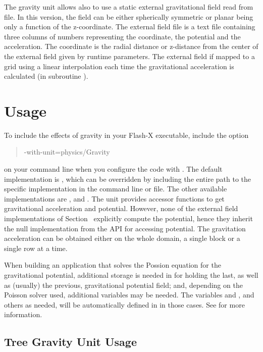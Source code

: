 The gravity unit allows also to use a static external gravitational field read
from file. In this version, the field can be either spherically symmetric or
planar being only a function of the z-coordinate. The external field file is a
text file containing three columns of numbers representing the coordinate, the
potential and the acceleration. The coordinate is the radial distance or
z-distance from the center of the external field given by runtime parameters.
The external field if mapped to a grid using a linear interpolation each time
the gravitational acceleration is calculated (in subroutine
).


\section{Usage}
\label{Sec:Gravity Usage}

To include the effects of gravity in your Flash-X executable,
include the option
\begin{quote}
-with-unit=physics/Gravity
\end{quote}
on your command line when you configure the code with .
The default implementation is , which can be overridden
by including the entire path to the specific implementation in the
command line or  file. The other available implementations are
,  and
. The  unit provides
accessor functions to get gravitational acceleration and
potential. However,
none of the external field implementations of Section~
explicitly
compute the potential, hence they inherit the null implementation from
the API for accessing potential. The gravitation acceleration can be
obtained either on the whole domain, a single block or a single row at
a time.

When building an application that solves the Possion equation for the
gravitational potential, additional storage is needed in 
for holding the last, as well as (usually) the previous, gravitational
potential field; and,
depending on the Poisson solver used, additional variables may be needed.
The variables
 and , and others as needed, will be
automatically defined in  in those cases. See
 for more information.


\subsection{Tree Gravity Unit Usage}
\label{Sec:GravityBHTreeUsing}

